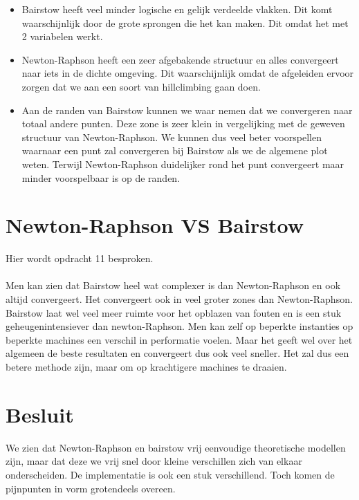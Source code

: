 \documentclass[a4paper,kulak]{kulakarticle}
\begin{document}
\begin{itemize}
	\item Bairstow heeft veel minder logische en gelijk verdeelde vlakken. Dit komt waarschijnlijk door de grote sprongen die het kan maken. Dit omdat het met 2 variabelen werkt.
	\item Newton-Raphson heeft een zeer afgebakende structuur en alles convergeert naar iets in de dichte omgeving. Dit waarschijnlijk omdat de afgeleiden ervoor zorgen dat we aan een soort van hillclimbing gaan doen.
	\item Aan de randen van Bairstow kunnen we waar nemen dat we convergeren naar totaal andere punten. Deze zone is zeer klein in vergelijking met de geweven structuur van Newton-Raphson. We kunnen dus veel beter voorspellen waarnaar een punt zal convergeren bij Bairstow als we de algemene plot weten. Terwijl Newton-Raphson duidelijker rond het punt convergeert maar minder voorspelbaar is op de randen.
\end{itemize}


\section{Newton-Raphson VS Bairstow}
Hier wordt opdracht 11 besproken.
\\~\\
Men kan zien dat Bairstow heel wat complexer is dan Newton-Raphson en ook altijd convergeert. Het convergeert ook in veel groter zones dan Newton-Raphson. Bairstow laat wel veel meer ruimte voor het opblazen van fouten en is een stuk geheugenintensiever dan newton-Raphson. Men kan zelf op beperkte instanties op beperkte machines een verschil in performatie voelen. Maar het geeft wel over het algemeen de beste resultaten en convergeert dus ook veel sneller. Het zal dus een betere methode zijn, maar om op krachtigere machines te draaien.

\section*{Besluit}

We zien dat Newton-Raphson en bairstow vrij eenvoudige theoretische modellen zijn, maar dat deze we vrij snel door kleine verschillen zich van elkaar onderscheiden. De implementatie is ook een stuk verschillend. Toch komen de pijnpunten in vorm grotendeels overeen.




\end{document}
